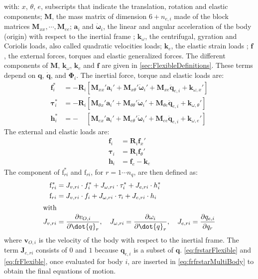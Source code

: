 \documentclass[wes, manuscript]{copernicus}
\renewcommand{\v}[1]{\boldsymbol{#1}}
\newcommand{\m}[1]{\boldsymbol{#1}}
\newcommand{\kanef}{\mathrm{f}}
\begin{document}
with: $x$, $\theta$, $e$, subscripts that indicate the translation, rotation and elastic components; $\m{M}$,  the mass matrix of dimension $6+n_{e,i}$ made of the block matrices $\m{M}_{xx},\cdots,\m{M}_{ee}$; $\v{a}_i$ and $\v{\dot{\omega}}_i$, the linear and angular acceleration of the body (origin) with respect to the inertial frame ; $\v{k}_\omega$, the centrifugal, gyration and Coriolis loads, also called quadratic velocities loads; $\v{k}_e$, the elastic strain loads ; $\v{f}$, the external forces, torques and elastic generalized forces.
The different components of $\m{M}$, $\m{k}_\omega$,  $\m{k}_e$ and $\v{f}$ are given in \autoref{sec:FlexibleDefinitions}.
These terms depend on $\v{q}$, $\v{\dot{q}}$, and $\v{\Phi}_i$.
% 
The inertial force, torque and elastic loads are:
\begin{align}
   \v{f}_{i}^* &= -\m{R}_i\left[\m{M}_{xx}'\v{a}_i' + \m{M}_{x\theta}'\v{\dot{\omega}}_i'  + \m{M}_{xe} \v{\ddot{q}}_{e,i}   + \v{k}_{\omega,x}'     \right]\\
   \v{\tau}_{i}^* &= -\m{R}_i\left[\m{M}_{\theta x}'\v{a}_i' + \m{M}_{\theta \theta}'\v{\dot{\omega}}_i'  + \m{M}_{\theta  e} \v{\ddot{q}}_{e,i}   + \v{k}_{\omega,\theta }'     \right]\\
   \v{h}_{i}^* &= - \phantom{\m{R}_i}      \left[\m{M}_{e x}'\v{a}_i' + \m{M}_{e \theta}'\v{\dot{\omega}}_i'  + \m{M}_{e  e} \v{\ddot{q}}_{e,i}   + \v{k}_{\omega,e }'     \right]
\end{align}
The external and elastic loads are:
\begin{align}
   \v{f}_{i} &= \m{R}_i\v{f}_x'\\
   \v{\tau}_{i} &= \m{R}_i\v{f}_\theta'\\
   \v{h}_{i} &=\v{f}_{e} - \v{k}_{e} 
\end{align}
The component of $\kanef_{ri}^*$ and $\kanef_{ri}$, for $r=1\cdots n_q$, are then defined as:
\begin{align}
   \kanef_{ri}^* &= 
       \v{J}_{v,ri} \cdot \v{f}_i^*  + \v{J}_{\omega,ri} \cdot \v{\tau}_i^*
     + \v{J}_{e,ri} \cdot \v{h}_i^*
    \label{eq:frstarFlexible}
     \\
   \kanef_{ri} &= 
       \v{J}_{v,ri} \cdot \v{f}_i  + \v{J}_{\omega,ri} \cdot \v{\tau}_i
     + \v{J}_{e,ri} \cdot \v{h}_i
    \label{eq:frFlexible}
     \\
     \intertext{with}
    \v{J}_{v,ri} &= \frac{\partial \v{v}_{O,i}}{\partial \dot{q}_r}
    ,\quad
    \v{J}_{\omega,ri} = \frac{\partial \v{\omega}_{i}}{\partial \dot{q}_r}
    ,\quad
    \v{J}_{e,ri} = \frac{\partial \v{q}_{e,i}}{\partial q_r}
    \label{eq:Jacobians}
\end{align}
where $\v{v}_{O,i}$ is the velocity of the body with respect to the inertial frame.
The term $\v{J}_{e,ri}$ consists of $0$ and $1$ because $\v{q}_{e,i}$ is a subset of $\v{q}$.
\autoref{eq:frstarFlexible} and \autoref{eq:frFlexible}, once evaluated for body $i$,
are inserted in \autoref{eq:frfrstarMultiBody} to obtain the final equations of motion.
\end{document}
